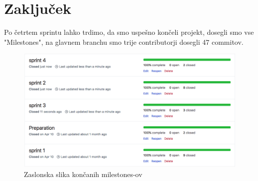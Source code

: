 \documentclass[a4paper,11pt]{article}
\begin{document}
\newpage
\section{Zaključek}
Po četrtem sprintu lahko trdimo, da smo uspešno končeli projekt, dosegli smo vse "Milestones", na glavnem branchu smo trije contributorji dosegli 47 commitov.


\begin{figure}[h]
\caption{Zaslonska slika končanih milestones-ov}
\centering
\includegraphics[width=1\textwidth]{closedsprints}
\end{figure}
\end{document}
